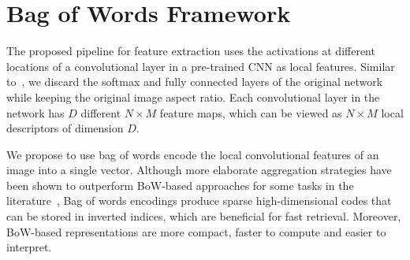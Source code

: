 \documentclass{sig-arxiv}
\begin{document}
\section{Bag of Words Framework}\label{3_bow}%

The proposed pipeline for feature extraction uses the activations at different locations of a convolutional layer in a pre-trained CNN as local features. Similar to~\cite{tolias2015,kalantidis2015}, we discard the softmax and fully connected layers of the original network while keeping the original image aspect ratio. Each convolutional layer in the network has $D$ different $N \times M$ feature maps, which can be viewed as $N \times M$ local descriptors of dimension $D$.

We propose to use bag of words encode the local convolutional features of an image into a single vector. Although more elaborate aggregation strategies have been shown to outperform BoW-based approaches for some tasks in the literature~\cite{vlad,fishervectors}, Bag of words encodings produce sparse high-dimensional codes that can be stored in inverted indices, which are beneficial for fast retrieval. Moreover, BoW-based representations are more compact, faster to compute and easier to interpret.
\end{document}
